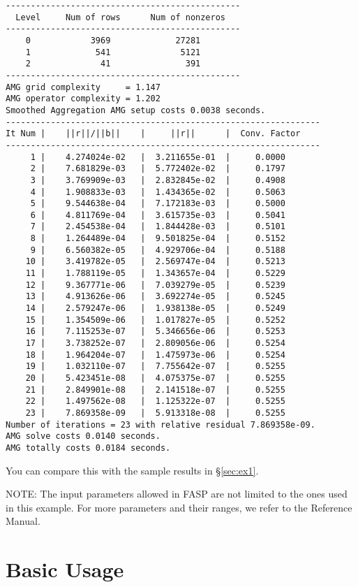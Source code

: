 \documentclass[11pt]{memoir}
\begin{document}
\begin{lstlisting}[numbers=none]
-----------------------------------------------
  Level     Num of rows      Num of nonzeros
-----------------------------------------------
    0            3969             27281
    1             541              5121
    2              41               391
-----------------------------------------------
AMG grid complexity     = 1.147
AMG operator complexity = 1.202
Smoothed Aggregation AMG setup costs 0.0038 seconds.
---------------------------------------------------------------
It Num |    ||r||/||b||    |     ||r||      |  Conv. Factor
---------------------------------------------------------------
     1 |    4.274024e-02   |  3.211655e-01  |     0.0000
     2 |    7.681829e-03   |  5.772402e-02  |     0.1797
     3 |    3.769909e-03   |  2.832845e-02  |     0.4908
     4 |    1.908833e-03   |  1.434365e-02  |     0.5063
     5 |    9.544638e-04   |  7.172183e-03  |     0.5000
     6 |    4.811769e-04   |  3.615735e-03  |     0.5041
     7 |    2.454538e-04   |  1.844428e-03  |     0.5101
     8 |    1.264489e-04   |  9.501825e-04  |     0.5152
     9 |    6.560382e-05   |  4.929706e-04  |     0.5188
    10 |    3.419782e-05   |  2.569747e-04  |     0.5213
    11 |    1.788119e-05   |  1.343657e-04  |     0.5229
    12 |    9.367771e-06   |  7.039279e-05  |     0.5239
    13 |    4.913626e-06   |  3.692274e-05  |     0.5245
    14 |    2.579247e-06   |  1.938138e-05  |     0.5249
    15 |    1.354509e-06   |  1.017827e-05  |     0.5252
    16 |    7.115253e-07   |  5.346656e-06  |     0.5253
    17 |    3.738252e-07   |  2.809056e-06  |     0.5254
    18 |    1.964204e-07   |  1.475973e-06  |     0.5254
    19 |    1.032110e-07   |  7.755642e-07  |     0.5255
    20 |    5.423451e-08   |  4.075375e-07  |     0.5255
    21 |    2.849901e-08   |  2.141518e-07  |     0.5255
    22 |    1.497562e-08   |  1.125322e-07  |     0.5255
    23 |    7.869358e-09   |  5.913318e-08  |     0.5255
Number of iterations = 23 with relative residual 7.869358e-09.
AMG solve costs 0.0140 seconds.
AMG totally costs 0.0184 seconds.
\end{lstlisting}
%
You can compare this with the sample results in \S\ref{sec:ex1}.

\begin{snugshade}\noindent
NOTE: The input parameters allowed in FASP are not limited to the ones used in this example. For more parameters and their ranges, we refer to the Reference Manual. 
\end{snugshade}

\chapter{Basic Usage}\label{ch:basic}
\end{document}
